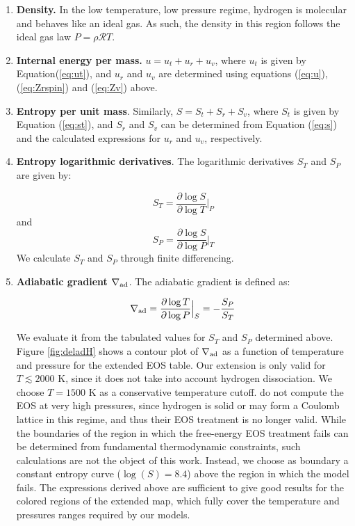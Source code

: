 \documentclass[apj]{emulateapj}
\newcommand{\delad}{\nabla_{\rm ad}}
\begin{document}
\begin{enumerate}

\item{\textbf{Density.}} In the low temperature, low pressure regime, hydrogen is molecular and behaves like an ideal gas. As such, the density in this region follows the ideal gas law $P=\rho \mathcal{R} T$.
\item{\textbf{Internal energy per mass.}} $u=u_t+u_r+u_v$, where $u_t$ is given by Equation(\ref{eq:ut}), and $u_r$ and $u_v$ are determined using equations (\ref{eq:u}), (\ref{eq:Zrspin}) and (\ref{eq:Zv}) above.
\item{\textbf{Entropy per unit mass}}. Similarly, $S=S_t+S_r+S_v$, where $S_t$ is given by Equation (\ref{eq:st}), and $S_r$ and $S_v$ can be determined from Equation (\ref{eq:s}) and the calculated expressions for $u_r$ and $u_v$, respectively.
\item{\textbf{Entropy logarithmic derivatives}}. The logarithmic derivatives $S_T$ and $S_P$ are given by:

\begin{equation}
\label{eq:sT}
S_T=\frac{\partial \log{S}}{\partial \log{T}} \Big |_P
\end{equation}
and
\begin{equation}
\label{eq:sP}
S_P=\frac{\partial \log{S}}{\partial \log{P}} \Big |_T
\end{equation}
We calculate $S_T$ and $S_P$ through finite differencing. 

\item{\textbf{Adiabatic gradient $\delad$}}. The adiabatic gradient is defined as:

\begin{equation}
\label{eq:deladSP}
\delad=\frac{\partial \log{T}}{\partial \log{P}} \Big |_S = -\frac{S_P}{S_T}
\end{equation}

We evaluate it from the tabulated values for $S_T$ and $S_P$ determined above. Figure \ref{fig:deladH} shows a contour plot of $\delad$ as a function of temperature and pressure for the extended EOS table. Our extension is only valid for $T \lesssim 2000$ K, since it does not take into account hydrogen dissociation. We choose $T=1500$ K as a conservative temperature cutoff. \citet{saumon95} do not compute the EOS at very high pressures, since hydrogen is solid or may form a Coulomb lattice in this regime, and thus their EOS treatment is no longer valid. While the boundaries of the region in which the free-energy EOS treatment fails can be determined from fundamental thermodynamic constraints, such calculations are not the object of this work. Instead, we choose as boundary a constant entropy curve ($\log(S)=8.4$) above the region in which the \citet{saumon95} model fails. The expressions derived above are sufficient to give good results for the colored regions of the extended map, which fully cover the temperature and pressures ranges required by our models.


\end{enumerate}
\end{document}
